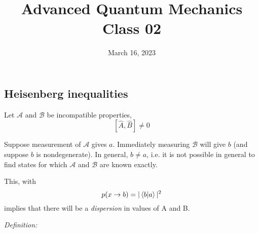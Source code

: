 \documentclass[12pt]{article}
\title{Advanced Quantum Mechanics\\Class 02}
\date{March 16, 2023}                                           %
\begin{document}
\maketitle

\setcounter{section}{1}
\setcounter{equation}{15}
\setcounter{subsection}{1}


\subsection{Heisenberg inequalities}

Let $\mathcal{A}$ and $\mathcal{B}$ be incompatible properties,
\[
[\hat{A}, \hat{B}] \neq 0
\]

Suppose measurement of $\mathcal{A}$ gives $a$. Immediately
measuring $\mathcal{B}$ will give $b$ (and suppose $b$ is nondegenerate). 
In general, $b \neq a$, i.e.
it is not possible in general to find states for which $\mathcal{A}$ and $\mathcal{B}$ are known exactly. 


This, with
\[
p(x \rightarrow b)=| \bra{b}\ket{a} |^{2}
\]
implies that there will be a \emph{dispersion} in values of A and B.

\emph{Definition:}
\end{document}

